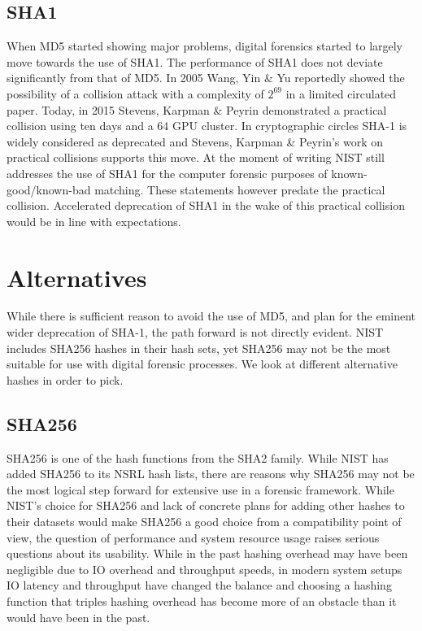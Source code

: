 \subsection{SHA1}
When MD5 started showing major problems, digital forensics started to largely move towards the use of SHA1. The performance of SHA1 does not deviate significantly from that of MD5. In 2005 Wang, Yin \& Yu reportedly showed the possibility of a collision attack with a complexity of \(2^{69}\) in a limited circulated paper. Today, in 2015 Stevens, Karpman \& Peyrin demonstrated a practical collision using ten days and a 64 GPU cluster. In cryptographic circles SHA-1 is widely considered as deprecated and Stevens, Karpman \& Peyrin's work on practical collisions supports this move. At the moment of writing NIST still addresses the use of SHA1 for the computer forensic purposes of known-good/known-bad matching. These statements however predate the practical collision. Accelerated deprecation of SHA1 in the wake of this practical collision would be in line with expectations.
\section{Alternatives}
While there is sufficient reason to avoid the use of MD5, and plan for the eminent wider deprecation of SHA-1, the path forward is not directly evident. NIST includes SHA256 hashes in their hash sets, yet SHA256 may not be the most suitable for use with digital forensic processes. We look at different alternative hashes in order to pick.
\subsection{SHA256}
SHA256 is one of the hash functions from the SHA2 family. While NIST has added SHA256 to its NSRL hash lists, there are reasons why SHA256 may not be the most logical step forward for extensive use in a forensic framework. While NIST's choice for SHA256 and lack of concrete plans for adding other hashes to their datasets would make SHA256 a good choice from a compatibility point of view, the question of performance and system resource usage raises serious questions about its usability. While in the past hashing overhead may have been negligible due to IO overhead and throughput speeds, in modern system setups IO latency and throughput have changed the balance and choosing a hashing function that triples hashing overhead has become more of an obstacle than it would have been in the past.  
